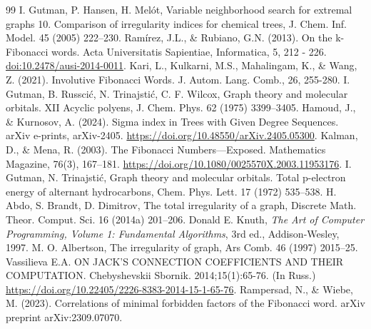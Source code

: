 \documentclass[12pt, a4paper]{article}
\begin{document}
\begin{thebibliography}{99}
\medskip
 I. Gutman, P. Hansen, H. Mel\'ot, Variable neighborhood search for extremal graphs 10. Comparison of irregularity indices for chemical trees, J. Chem. Inf. Model. 45 (2005) 222–230.
\medskip
 Ramírez, J.L., \& Rubiano, G.N. (2013). On the k-Fibonacci words. Acta Universitatis Sapientiae, Informatica, 5, 212 - 226. \url{doi:10.2478/ausi-2014-0011}.
\medskip
 Kari, L., Kulkarni, M.S., Mahalingam, K., \& Wang, Z. (2021). Involutive Fibonacci Words. J. Autom. Lang. Comb., 26, 255-280.
\medskip
 I. Gutman, B. Russci\'c, N. Trinajsti\'c, C. F. Wilcox, Graph theory and molecular orbitals. XII Acyclic polyens, J. Chem. Phys. 62 (1975) 3399–3405.
\medskip
 Hamoud, J., \& Kurnosov, A. (2024). Sigma index in Trees with Given Degree Sequences. arXiv e-prints, arXiv-2405. \url{https://doi.org/10.48550/arXiv.2405.05300}.
\medskip
 Kalman, D., \& Mena, R. (2003). The Fibonacci Numbers—Exposed. Mathematics Magazine, 76(3), 167–181. \url{https://doi.org/10.1080/0025570X.2003.11953176}.
\medskip
 I. Gutman, N. Trinajsti\'c, Graph theory and molecular orbitals. Total p-electron energy of alternant hydrocarbons, Chem. Phys. Lett. 17 (1972) 535–538.
\medskip
 H. Abdo, S. Brandt, D. Dimitrov, The total irregularity of a graph, Discrete Math. Theor. Comput. Sci. 16 (2014a) 201–206.
\medskip
 Donald E. Knuth, \textit{The Art of Computer Programming, Volume 1: Fundamental Algorithms}, 3rd ed., Addison-Wesley, 1997.
\medskip
 M. O. Albertson, The irregularity of graph, Ars Comb. 46 (1997) 2015–25.
\medskip
 Vassilieva E.A. ON JACK’S CONNECTION COEFFICIENTS AND THEIR COMPUTATION. Chebyshevskii Sbornik. 2014;15(1):65-76. (In Russ.) \url{https://doi.org/10.22405/2226-8383-2014-15-1-65-76}.
 Rampersad, N., \& Wiebe, M. (2023). Correlations of minimal forbidden factors of the Fibonacci word. arXiv preprint arXiv:2309.07070.

\end{thebibliography}
\end{document}
